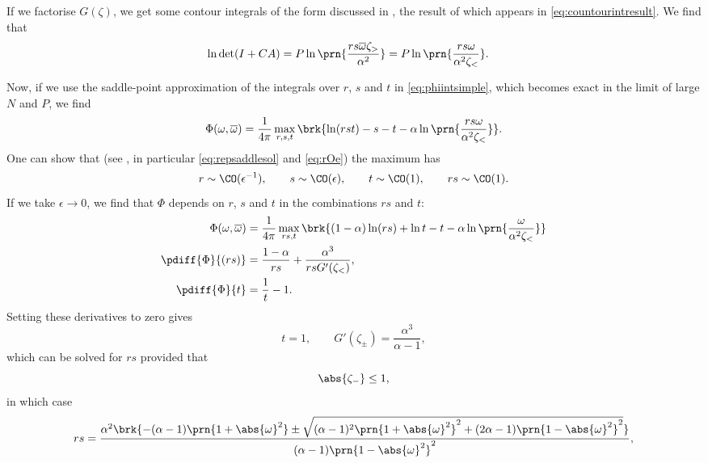 \documentclass[12pt]{article}
\newcommand{\inv}{^{-1}}
\newcommand{\omb}{\overline{\omega}}
\newcommand{\opo}{\prn{1+\abs{\omega}^2}}
\newcommand{\omo}{\prn{1-\abs{\omega}^2}}
\begin{document}
If we factorise $G(\zeta)$, we get some contour integrals of the form discussed in , the result of which appears in \eqref{eq:countourintresult}.
We find that
%
\begin{equation}\label{eq:detsimpleresult}
\begin{aligned}
  \ln\det(I+CA) &= P\ln\prn{\frac{rs\omb\zeta_>}{\alpha^2}} = P\ln\prn{\frac{rs\omega}{\alpha^2\zeta_<}}.
\end{aligned}
\end{equation}
%

Now, if we use the saddle-point approximation of the integrals over $r$, $s$ and $t$ in \eqref{eq:phiintsimple}, which becomes exact in the limit of large $N$ and $P$, we find
%
\begin{equation}\label{eq:phisaddlesimple}
  \Phi(\omega,\omb) = \frac{1}{4\pi} \max_{r,s,t} \brk{ \ln(rst) - s - t -\alpha\ln\prn{\frac{rs\omega}{\alpha^2\zeta_<}}}.
\end{equation}
%
One can show that (see , in particular \eqref{eq:repsaddlesol} and \eqref{eq:rOe}) the maximum has
%
\begin{equation}\label{eq:saddleOe}
  r \sim \CO(\epsilon\inv),
  \qquad
  s \sim \CO(\epsilon),
  \qquad
  t \sim \CO(1),
  \qquad
  rs \sim \CO(1).
\end{equation}
%
If we take $\epsilon\to0$, we find that $\Phi$ depends on $r$, $s$ and $t$ in the combinations $rs$ and $t$:
%
\begin{equation}\label{eq:phimaxsimple}
\begin{aligned}
  \Phi(\omega,\omb) &= \frac{1}{4\pi} \max_{rs,t} \brk{ (1-\alpha)\ln(rs)+\ln t - t -\alpha\ln\prn{\frac{\omega}{\alpha^2\zeta_<}}}\\
  \pdiff{\Phi}{(rs)} &= \frac{1-\alpha}{rs} + \frac{\alpha^3}{rs G'(\zeta_<)} ,\\
  \pdiff{\Phi}{t}&= \frac{1}{t} - 1 .
\end{aligned}
\end{equation}
%
Setting these derivatives to zero gives
%
\begin{equation}\label{eq:saddlecond}
  t=1,
  \qquad
  G'(\zeta_\pm)=\frac{\alpha^3}{\alpha-1},
\end{equation}
%
which can be solved for $rs$ provided that
%
\begin{equation}\label{eq:saddlereq}
  \abs{\zeta_-}\leq1,
\end{equation}
%
in which case
%
\begin{equation}\label{eq:saddlesolrs}
\begin{aligned}
  rs &= \frac{\alpha^2 \brk{ -(\alpha-1)\opo \pm \sqrt{ (\alpha-1)^2\opo^2 + (2\alpha-1)\omo^2 } }}{(\alpha-1)\omo^2},\\
\end{aligned}
\end{equation}
\end{document}
